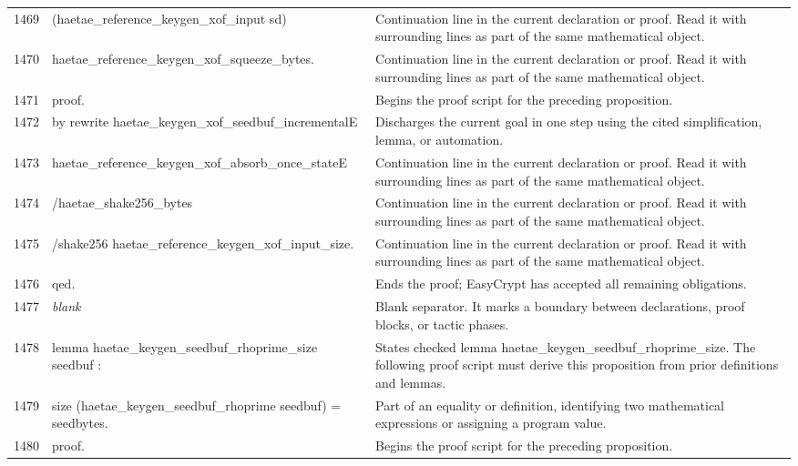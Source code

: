 \documentclass[10pt]{article}
\begin{document}
\begin{longtable}{r L{0.53\textwidth} L{0.37\textwidth}}
1469 & {\ttfamily\scriptsize     (haetae\_reference\_keygen\_xof\_input sd)} & Continuation line in the current declaration or proof.  Read it with surrounding lines as part of the same mathematical object. \\
1470 & {\ttfamily\scriptsize     haetae\_reference\_keygen\_xof\_squeeze\_bytes.} & Continuation line in the current declaration or proof.  Read it with surrounding lines as part of the same mathematical object. \\
1471 & {\ttfamily\scriptsize proof.} & Begins the proof script for the preceding proposition. \\
1472 & {\ttfamily\scriptsize by rewrite haetae\_keygen\_xof\_seedbuf\_incrementalE} & Discharges the current goal in one step using the cited simplification, lemma, or automation. \\
1473 & {\ttfamily\scriptsize            haetae\_reference\_keygen\_xof\_absorb\_once\_stateE} & Continuation line in the current declaration or proof.  Read it with surrounding lines as part of the same mathematical object. \\
1474 & {\ttfamily\scriptsize            /haetae\_shake256\_bytes} & Continuation line in the current declaration or proof.  Read it with surrounding lines as part of the same mathematical object. \\
1475 & {\ttfamily\scriptsize            /shake256 haetae\_reference\_keygen\_xof\_input\_size.} & Continuation line in the current declaration or proof.  Read it with surrounding lines as part of the same mathematical object. \\
1476 & {\ttfamily\scriptsize qed.} & Ends the proof; EasyCrypt has accepted all remaining obligations. \\
1477 & {\ttfamily\scriptsize \emph{blank}} & Blank separator.  It marks a boundary between declarations, proof blocks, or tactic phases. \\
1478 & {\ttfamily\scriptsize lemma haetae\_keygen\_seedbuf\_rhoprime\_size seedbuf :} & States checked lemma haetae\_keygen\_seedbuf\_rhoprime\_size.  The following proof script must derive this proposition from prior definitions and lemmas. \\
1479 & {\ttfamily\scriptsize   size (haetae\_keygen\_seedbuf\_rhoprime seedbuf) = seedbytes.} & Part of an equality or definition, identifying two mathematical expressions or assigning a program value. \\
1480 & {\ttfamily\scriptsize proof.} & Begins the proof script for the preceding proposition. \\

\end{longtable}
\end{document}
